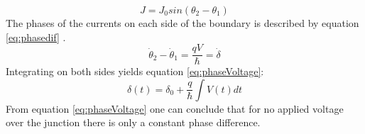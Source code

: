 \begin{equation}
    J = J_0sin(\theta_2 - \theta_1)
    \label{eq:joseph}
\end{equation}
The phases of the currents on each side of the boundary is described by equation \ref{eq:phasedif} \cite{Feynman_Leighton_Sands_2013}.
\begin{equation}
    \dot\theta_2 - \dot\theta_1 = \frac{qV}{\hbar} = \dot\delta
    \label{eq:phasedif}
\end{equation}
Integrating on both sides yields equation \ref{eq:phaseVoltage}:
\begin{equation}
    \delta(t) = \delta_0 + \frac{q}{\hbar}\int V(t) dt
    \label{eq:phaseVoltage}
\end{equation}
From equation \ref{eq:phaseVoltage} one can conclude that for no applied voltage over the junction there is only a constant phase difference.

